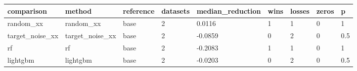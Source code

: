 \begin{tabular}{lllllllll}
\toprule
comparison & method & reference & datasets & median\_reduction & wins & losses & zeros & p \\
\midrule
random\_xx & random\_xx & base & 2 & 0.0116 & 1 & 1 & 0 & 1 \\
target\_noise\_xx & target\_noise\_xx & base & 2 & -0.0859 & 0 & 2 & 0 & 0.5 \\
rf & rf & base & 2 & -0.2083 & 1 & 1 & 0 & 1 \\
lightgbm & lightgbm & base & 2 & -0.0203 & 0 & 2 & 0 & 0.5 \\
\bottomrule
\end{tabular}
